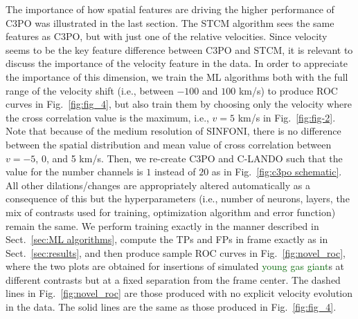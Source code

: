 \documentclass{aa}
\newcommand{\newchange}[1]{\textcolor{darkgreen}{#1}}
\begin{document}
The importance of how spatial features are driving the higher performance of C3PO was illustrated in the last section. The STCM algorithm sees the same features as C3PO, but with just one of the relative velocities.
Since velocity seems to be the key feature difference between C3PO and STCM, it is relevant to discuss the importance of the velocity feature in the data. 
In order to appreciate the importance of this dimension, we train the ML algorithms both with the full range of the velocity shift (i.e., between $-100$ and $100$ km/s) to produce ROC curves in Fig.~\ref{fig:fig_4}, but also train them by choosing only the velocity where the cross correlation value is the maximum, i.e., $v=5$ km/s in Fig.~\ref{fig:fig-2}.
Note that because of the medium resolution of SINFONI, there is no difference between the spatial distribution and mean value of cross correlation between $v=-5$, 0, and 5 km/s. 
Then, we re-create C3PO and C-LANDO such that the value for the number channels is $1$ instead of $20$ as in Fig.~\ref{fig:c3po schematic}.
All other dilations/changes are appropriately altered automatically as a consequence of this but the hyperparameters (i.e., number of neurons, layers, the mix of contrasts used for training, optimization algorithm and error function) remain the same.
We perform training exactly in the manner described in Sect.~\ref{sec:ML algorithms}, compute the TPs and FPs in frame exactly as in Sect.~\ref{sec:results}, and then produce sample ROC curves in Fig.~\ref{fig:novel_roc}, where the two plots are obtained for insertions of simulated \newchange{young gas giant}s at different contrasts but at a fixed separation from the frame center.
The dashed lines in Fig.~\ref{fig:novel_roc} are those produced with no explicit velocity evolution in the data.
The solid lines are the same as those produced in Fig.~\ref{fig:fig_4}.
\end{document}
